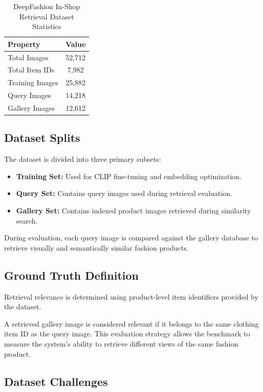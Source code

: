 \documentclass[11pt,a4paper]{article}
\begin{document}
\begin{table}[H]
\centering
\caption{DeepFashion In-Shop Retrieval Dataset Statistics}
\begin{tabular}{lc}
\toprule
Property & Value \\
\midrule
Total Images & 52,712 \\
Total Item IDs & 7,982 \\
Training Images & 25,882 \\
Query Images & 14,218 \\
Gallery Images & 12,612 \\
\bottomrule
\end{tabular}
\end{table}

\subsection{Dataset Splits}

The dataset is divided into three primary subsets:

\begin{itemize}
    \item \textbf{Training Set:} Used for CLIP fine-tuning and embedding optimization.
    
    \item \textbf{Query Set:} Contains query images used during retrieval evaluation.
    
    \item \textbf{Gallery Set:} Contains indexed product images retrieved during similarity search.
\end{itemize}

During evaluation, each query image is compared against the gallery database to retrieve visually and semantically similar fashion products.

\subsection{Ground Truth Definition}

Retrieval relevance is determined using product-level item identifiers provided by the dataset.

A retrieved gallery image is considered relevant if it belongs to the same clothing item ID as the query image. This evaluation strategy allows the benchmark to measure the system’s ability to retrieve different views of the same fashion product.

\subsection{Dataset Challenges}
\end{document}
